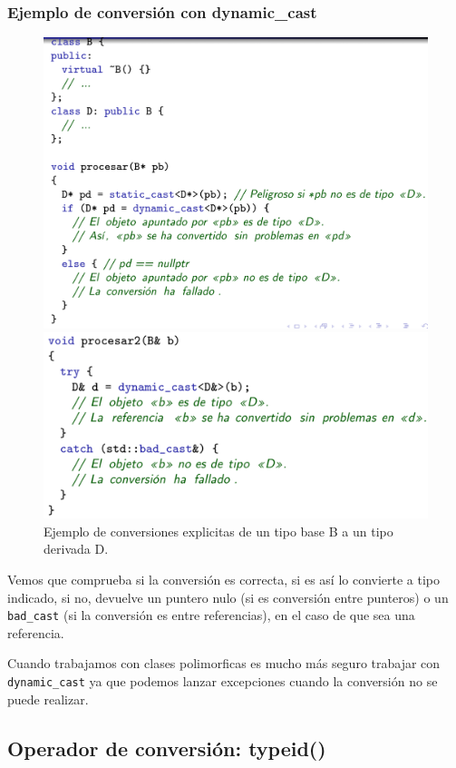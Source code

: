 \subsubsection{Ejemplo de conversión con dynamic\_cast}

\begin{figure}[h]
	\begin{minipage}{0.5\textwidth}
		\includegraphics[width=\textwidth]{Imagenes/poli9.png}
	\end{minipage}
\hfill
	\begin{minipage}{0.5\textwidth}
		\vspace{-2cm}
		\includegraphics[width=\textwidth]{Imagenes/poli10.png}	
	\end{minipage}
\caption{Ejemplo de conversiones explicitas de un tipo base B a un tipo derivada D.}
\end{figure}

Vemos que comprueba si la conversión es correcta, si es así lo convierte a tipo indicado, si no, devuelve un puntero nulo (si es conversión entre punteros) o un \texttt{bad\_cast} (si la conversión es entre referencias), en el caso de que sea una referencia.

Cuando trabajamos con clases polimorficas es mucho más seguro trabajar con \texttt{dynamic\_cast} ya que podemos lanzar excepciones cuando la conversión no se puede realizar.

\subsection{Operador de conversión: typeid()}















